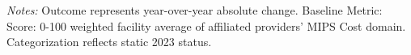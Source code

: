 \begin{table}[htbp]
    \centering
    \caption{Timeline of Change in Facility Avg: MIPS Cost by Authority}
    \label{tab:d_mips_cost_score_timeline}
    \vspace{0.2cm}
    \vspace{0.1cm}
    \begin{minipage}{\textwidth}
        \footnotesize \textit{Notes:} Outcome represents year-over-year absolute change. Baseline Metric: Score: 0-100 weighted facility average of affiliated providers' MIPS Cost domain. Categorization reflects static 2023 status.
    \end{minipage}
\end{table}